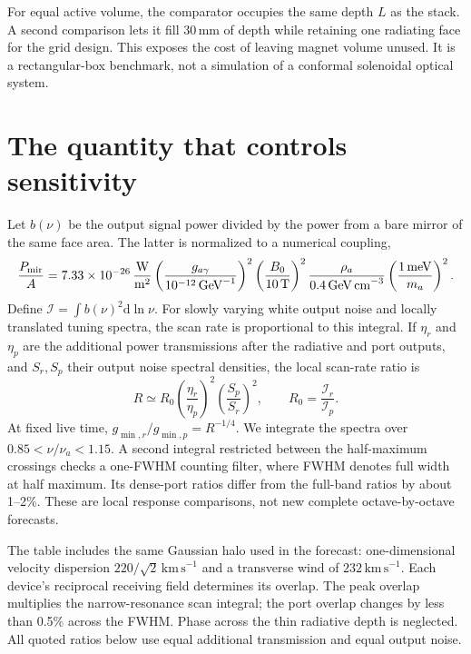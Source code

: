 \documentclass[10pt]{article}
\newcommand{\meV}{\,\mathrm{meV}}
\newcommand{\dd}{\mathrm d}
\begin{document}
For equal active volume, the comparator occupies the same depth $L$ as the stack. A second comparison lets it fill 30\,mm of depth while retaining one radiating face for the grid design. This exposes the cost of leaving magnet volume unused. It is a rectangular-box benchmark, not a simulation of a conformal solenoidal optical system.

\section{The quantity that controls sensitivity}
Let $b(\nu)$ be the output signal power divided by the power from a bare mirror of the same face area. The latter is normalized to a numerical coupling,
\begin{equation}
 \frac{P_{\rm mir}}{A}=7.33\times10^{-26}\,\frac{\mathrm W}{\mathrm m^2}
 \left(\frac{g_{a\gamma}}{10^{-12}\,\mathrm{GeV}^{-1}}\right)^2
 \left(\frac{B_0}{10\,\mathrm T}\right)^2
 \frac{\rho_a}{0.4\,\mathrm{GeV\,cm}^{-3}}
 \left(\frac{1\meV}{m_a}\right)^2.
\end{equation}
Define $\mathcal I=\int b(\nu)^2\dd\ln\nu$. For slowly varying white output noise and locally translated tuning spectra, the scan rate is proportional to this integral. If $\eta_r$ and $\eta_p$ are the additional power transmissions after the radiative and port outputs, and $S_r,S_p$ their output noise spectral densities, the local scan-rate ratio is
\begin{equation}
 R\simeq R_0\left(\frac{\eta_r}{\eta_p}\right)^2
              \left(\frac{S_p}{S_r}\right)^2,
 \qquad R_0=\frac{\mathcal I_r}{\mathcal I_p}.
 \label{eq:ratio}
\end{equation}
At fixed live time, $g_{\min,r}/g_{\min,p}=R^{-1/4}$. We integrate the spectra over $0.85<\nu/\nu_a<1.15$. A second integral restricted between the half-maximum crossings checks a one-FWHM counting filter, where FWHM denotes full width at half maximum. Its dense-port ratios differ from the full-band ratios by about 1--2\%. These are local response comparisons, not new complete octave-by-octave forecasts.

The table includes the same Gaussian halo used in the forecast: one-dimensional velocity dispersion $220/\sqrt2\,\mathrm{km\,s}^{-1}$ and a transverse wind of $232\,\mathrm{km\,s}^{-1}$. Each device's reciprocal receiving field determines its overlap. The peak overlap multiplies the narrow-resonance scan integral; the port overlap changes by less than 0.5\% across the FWHM. Phase across the thin radiative depth is neglected. All quoted ratios below use equal additional transmission and equal output noise.
\end{document}
